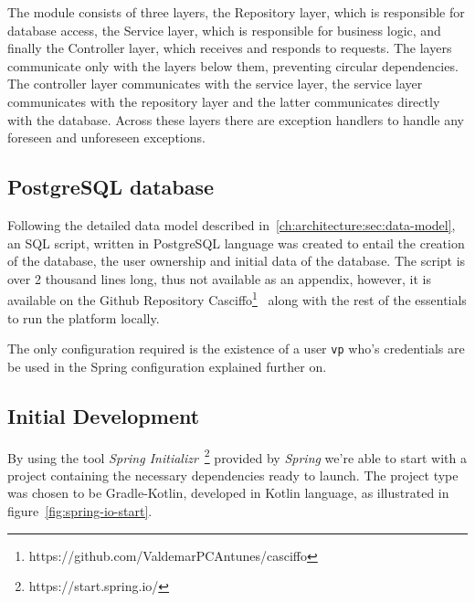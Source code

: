 The module consists of three layers, the Repository layer, which is responsible for database access, the Service layer, which is responsible for business logic, and finally the Controller layer, which receives and responds to requests. The layers communicate only with the layers below them, preventing circular dependencies. The controller layer communicates with the service layer, the service layer communicates with the repository layer and the latter communicates directly with the database. Across these layers there are exception handlers to handle any foreseen and unforeseen exceptions.


\subsection{PostgreSQL database}\label{ch:impl:sec:be:subsec:config-postgresql}

Following the detailed data model described in~\ref{ch:architecture:sec:data-model}, an SQL script, written in PostgreSQL language was created to entail the creation of the database, the user ownership and initial data of the database. The script is over 2 thousand lines long, thus not available as an appendix, however, it is available on the Github Repository Casciffo\footnote{https://github.com/ValdemarPCAntunes/casciffo}~\label{fn:gh-casciffo-impl} along with the rest of the essentials to run the platform locally.

The only configuration required is the existence of a user \texttt{vp} who's credentials are be used in the Spring configuration explained further on.  


\subsection{Initial Development}\label{ch:impl:sec:be:subsec:be-init-dev}

By using the tool \textit{Spring Initializr}~\footnote{https://start.spring.io/}\label{fn:spring-io} provided by \textit{Spring} we're able to start with a project containing the necessary dependencies ready to launch. The project type was chosen to be Gradle-Kotlin, developed in Kotlin language, as illustrated in figure~\ref{fig:spring-io-start}.

